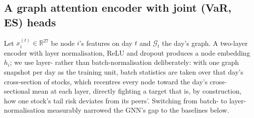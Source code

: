 \documentclass{llncs}
\begin{document}
\subsection{A graph attention encoder with joint (VaR, ES) heads}
Let $x_i^{(t)}\in\mathbb{R}^{27}$ be node $i$'s features on day $t$ and
$\mathcal{G}_t$ the day's graph. A two-layer encoder with layer normalisation,
ReLU and dropout produces a node embedding $h_i$; we use layer- rather than
batch-normalisation deliberately: with one graph snapshot per day as the
training unit, batch statistics are taken over that day's cross-section of
stocks, which recentres every node toward the day's cross-sectional mean at
each layer, directly fighting a target that is, by construction, how one
stock's tail risk deviates from its peers'. Switching from batch- to
layer-normalisation measurably narrowed the GNN's gap to the baselines below.
\end{document}
